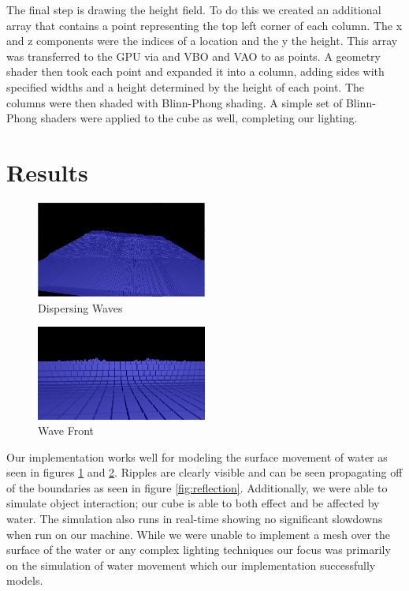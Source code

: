 \documentclass[11pt]{article}
\begin{document}
The final step is drawing the height field.  To do this we created an additional array that contains a point representing the top left corner of each column.  The x and z components were the indices of a location and the y the height.  This array was transferred to the GPU via and VBO and VAO to as points.  A geometry shader then took each point and expanded it into a column, adding sides with specified widths and a height determined by the height of each point.  The columns were then shaded with Blinn-Phong shading.  A simple set of Blinn-Phong shaders were applied to the cube as well, completing our lighting.

\section{Results}

\begin{figure}[H]
    \caption{Dispersing Waves}
    \label{fig:waves}
    \centering
    \includegraphics[width=0.5\textwidth]{../www/images/waterWaves}
\end{figure}

\begin{figure}[H]
    \caption{Wave Front}
    \label{fig:front}
    \centering
    \includegraphics[width=0.5\textwidth]{../www/images/waveFront}
\end{figure}

Our implementation works well for modeling the surface movement of water as 
seen in figures \ref{fig:waves} and \ref{fig:front}. Ripples are clearly 
visible and can be seen propagating off of the boundaries as seen in figure 
\ref{fig:reflection}. Additionally, we were able to simulate object 
interaction; our cube is able to both effect and be affected by water.  The 
simulation also runs in real-time showing no significant slowdowns when run on 
our machine. While we were unable to implement a mesh over the surface of the 
water or any complex lighting techniques our focus was primarily on the 
simulation of water movement which our implementation successfully models.
\end{document}
